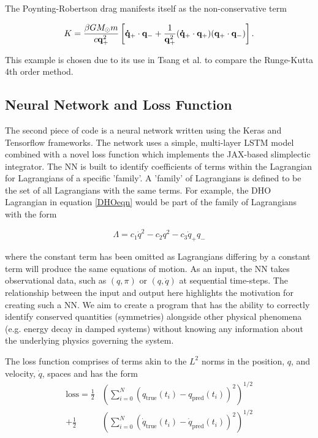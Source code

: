 \documentclass[10pt]{iopart}
\begin{document}
The Poynting-Robertson drag manifests itself as the non-conservative term

\begin{equation}
	K = \frac{\beta GM_\odot m}{c\bold{q}_+^2}\left[\bold{\dot{q}}_+\cdot \bold{q}_- + \frac{1}{\bold{q}_+^2}(\bold{\dot{q}}_+\cdot\bold{q}_+)(\bold{q}_+\cdot\bold{q}_-)\right].
\end{equation}

This example is chosen due to its use in Tsang et al. \cite{Tsang_Slimplectic} to compare the Runge-Kutta 4th order method.

\subsection{Neural Network and Loss Function}
The second piece of code is a neural network written using the Keras \cite{Keras} and Tensorflow \cite{TF} frameworks. The network uses a simple, multi-layer LSTM model \cite{LSTM} combined with a novel loss function which implements the JAX-based slimplectic integrator. The NN is built to identify coefficients of terms within the Lagrangian for Lagrangians of a specific 'family'. A 'family' of Lagrangians is defined to be the set of all Lagrangians with the same terms. For example, the DHO Lagrangian in equation \ref{DHOeqn} would be part of the family of Lagrangians with the form 

\begin{equation}
	\label{DHOFamily}
	\Lambda = c_1\dot{q}^2 - c_2q^2 - c_3\dot{q}_+q_-
\end{equation}

where the constant term has been omitted as Lagrangians differing by a constant term will produce the same equations of motion. As an input, the NN takes observational data, such as $(q,\pi)$ or $(q,\dot{q})$ at sequential time-steps. The relationship between the input and output here highlights the motivation for creating such a NN. We aim to create a program that has the ability to correctly identify conserved quantities (symmetries) alongside other physical phenomena (e.g. energy decay in damped systems) without knowing any information about the underlying physics governing the system. 

The loss function comprises of terms akin to the $L^2$ norms in the position, $q$, and velocity, $\dot q$, spaces and has the form
\begin{equation}
\begin{split}
		\label{lossfunc}
	\textrm{loss} = \frac{1}{2}&\left(\sum_{i=0}^N (q_{\textrm{true}}(t_i) - q_{\textrm{pred}}(t_i))^2\right)^{1/2} \\ +  \frac{1}{2}&\left(\sum_{i=0}^N (\dot{q}_{\textrm{true}}(t_i) - \dot{q}_{\textrm{pred}}(t_i))^2\right)^{1/2}
\end{split}
\end{equation}
\end{document}
